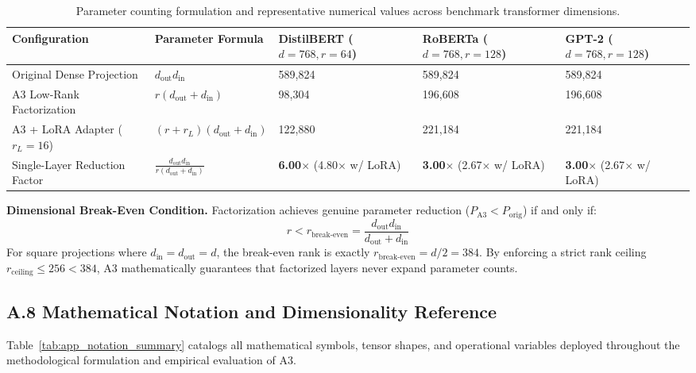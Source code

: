 \begin{table}[H]
\centering
\small
\begin{tabular}{lllll}
\toprule
\textbf{Configuration} & \textbf{Parameter Formula} & \textbf{DistilBERT ($d=768, r=64$)} & \textbf{RoBERTa ($d=768, r=128$)} & \textbf{GPT-2 ($d=768, r=128$)} \\
\midrule
Original Dense Projection & $d_\text{out} d_\text{in}$ & 589,824 & 589,824 & 589,824 \\
A3 Low-Rank Factorization & $r(d_\text{out} + d_\text{in})$ & 98,304 & 196,608 & 196,608 \\
A3 + LoRA Adapter ($r_L=16$) & $(r + r_L)(d_\text{out} + d_\text{in})$ & 122,880 & 221,184 & 221,184 \\
Single-Layer Reduction Factor & $\frac{d_\text{out} d_\text{in}}{r(d_\text{out} + d_\text{in})}$ & \textbf{6.00$\times$} (4.80$\times$ w/ LoRA) & \textbf{3.00$\times$} (2.67$\times$ w/ LoRA) & \textbf{3.00$\times$} (2.67$\times$ w/ LoRA) \\
\bottomrule
\end{tabular}
\caption{Parameter counting formulation and representative numerical values across benchmark transformer dimensions.}
\label{tab:parameter_counting_formulation}
\end{table}

\textbf{Dimensional Break-Even Condition.} Factorization achieves genuine parameter reduction ($P_\text{A3} < P_\text{orig}$) if and only if:
\[
r < r_\text{break-even} = \frac{d_\text{out} d_\text{in}}{d_\text{out} + d_\text{in}}
\tag{A.16}
\]
For square projections where $d_\text{in} = d_\text{out} = d$, the break-even rank is exactly $r_\text{break-even} = d/2 = 384$. By enforcing a strict rank ceiling $r_{\mathrm{ceiling}} \le 256 < 384$, A3 mathematically guarantees that factorized layers never expand parameter counts.

\subsection{A.8 Mathematical Notation and Dimensionality Reference}
\label{sec:app_notation}

Table~\ref{tab:app_notation_summary} catalogs all mathematical symbols, tensor shapes, and operational variables deployed throughout the methodological formulation and empirical evaluation of A3.

